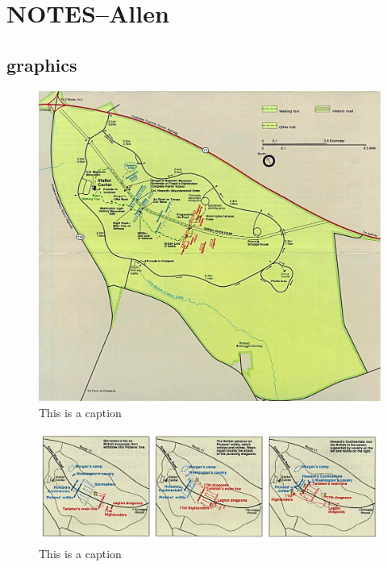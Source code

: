 
\section{NOTES--Allen}

\subsection{graphics}


\begin{figure}[h]
	\singlespacing
	\begin{center}
	\includegraphics[width=6in]{gfx/cowp_95}
	\end{center}
	\caption{This is a caption}
	\label{cowpbatt95}
\end{figure}



\begin{figure}[h]
	\singlespacing
	\begin{center}
	\includegraphics[width=6in]{gfx/cowp_batt95}
	\end{center}
	\caption{This is a caption}
	\label{cowp95}
\end{figure}


